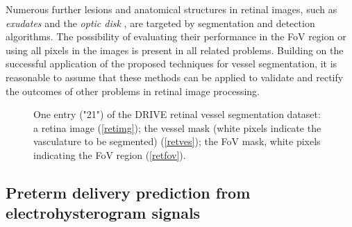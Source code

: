 \documentclass[5p, final]{elsarticle}
\begin{document}
Numerous further lesions and anatomical structures in retinal images, such as \emph{exudates} \cite{exu} and the \emph{optic disk} \cite{od}, are targeted by segmentation and detection algorithms. The possibility of evaluating their performance in the FoV region or using all pixels in the images is present in all related problems. Building on the successful application of the proposed techniques for vessel segmentation, it is reasonable to assume that these methods can be applied to validate and rectify the outcomes of other problems in retinal image processing.

\begin{figure}[t]
\begin{center}
\end{center}
\caption{One entry ("21") of the DRIVE retinal vessel segmentation dataset: a retina image (\ref{retimg}); the vessel mask (white pixels indicate the vasculature to be segmented) (\ref{retves}); the FoV mask, white pixels indicating the FoV region (\ref{retfov}).}
\label{fig:retina}
\end{figure}
    
\subsection{Preterm delivery prediction from electrohysterogram signals}
\label{sec:ehg}
\end{document}
